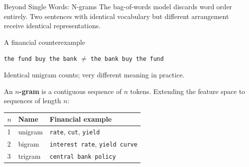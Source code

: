 \documentclass[aspectratio=169]{beamer}
\begin{document}
%
%
\begin{frame}{Beyond Single Words: N-grams}
The bag-of-words model discards word order entirely.
Two sentences with identical vocabulary but different arrangement receive identical representations.
 
\vspace{0.12cm}
\begin{block}{A financial counterexample}
\begin{center}
\texttt{the fund buy the bank} \quad $\neq$ \quad \texttt{the bank buy the fund}
\end{center}
Identical unigram counts; very different meaning in practice.
\end{block}
 
\vspace{0.12cm}
An \textbf{$n$-gram} is a contiguous sequence of $n$ tokens.
Extending the feature space to sequences of length $n$:
\begin{center}
\small
\begin{tabular}{lll}
\toprule
$n$ & Name & Financial example \\
\midrule
1 & unigram & \texttt{rate}, \texttt{cut}, \texttt{yield} \\
2 & bigram  & \texttt{interest rate}, \texttt{yield curve} \\
3 & trigram & \texttt{central bank policy} \\
\bottomrule
\end{tabular}
\end{center}
\end{frame}
%
%
\end{document}
